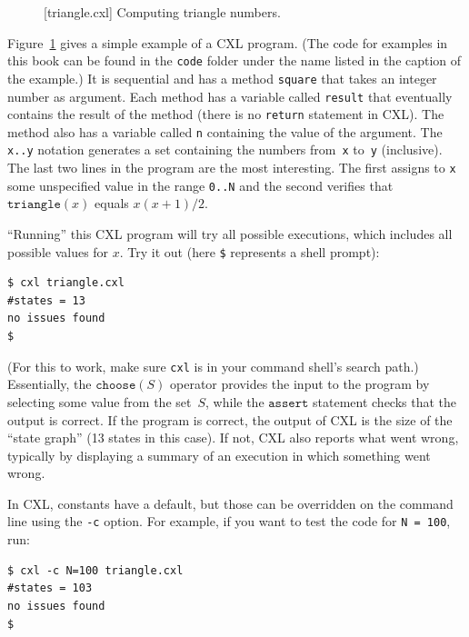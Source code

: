 \documentclass{report}
\newenvironment{code}{
\tcolorbox
}{
\endtcolorbox
}
\begin{document}
\begin{figure}
\begin{code}
\end{code}
\caption{[triangle.cxl] Computing triangle numbers.}
\label{fig:triangle}
\end{figure}

Figure~\ref{fig:triangle} gives a simple example of a CXL program.
(The code for examples in this book can be found in the \texttt{code} folder under
the name listed in the caption of the example.)
It is sequential and has a method \texttt{square} that takes
an integer number as argument.  Each method has a variable called
\texttt{result} that eventually contains the result of the
method (there is no \texttt{return} statement in CXL).  The method
also has a variable called \texttt{n} containing the value of the
argument.  The \texttt{x..y} notation generates a set containing the numbers
from~\texttt{x} to~\texttt{y} (inclusive).  The last two lines in the program are
the most interesting.
The first assigns to \texttt{x} some unspecified value in the range \texttt{0..N}
and the second verifies that $\mathtt{triangle}(x)$ equals $x(x+1)/2$.

``Running'' this CXL program will try all possible executions, which
includes all possible values for $x$.  Try it out (here \texttt{\$}
represents a shell prompt):

\begin{code}
\begin{verbatim}
$ cxl triangle.cxl
#states = 13
no issues found
$
\end{verbatim}
\end{code}

(For this to work, make sure \texttt{cxl} is in your command shell's search path.)
Essentially, the $\texttt{choose}(S)$
operator provides the input to the program by selecting some value from the
set~$S$, while the $\texttt{assert}$ statement checks that the output is
correct.  If the program is correct, the output of CXL is the size of the
``state graph'' (13 states in this case).  If not, CXL also
reports what went wrong, typically by displaying a summary of an execution in
which something went wrong.

In CXL, constants have a default, but those can be overridden on the command
line using the \texttt{-c} option.
For example, if you want to test the code for \texttt{N = 100}, run:
\begin{code}
\begin{verbatim}
$ cxl -c N=100 triangle.cxl
#states = 103
no issues found
$
\end{verbatim}
\end{code}
\end{document}
